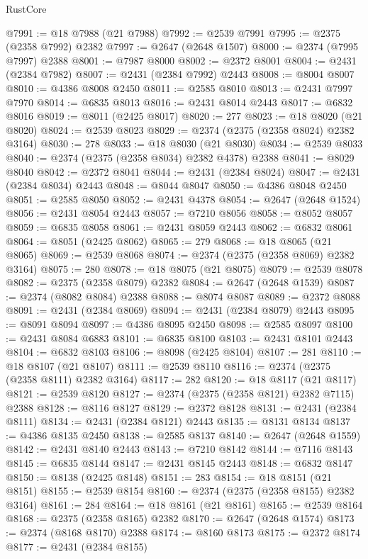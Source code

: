 \begin{lexlean}{RustCore}
\begin{coremodule}
@7991 := @18 @7988 (@21 @7988)
@7992 := @2539 @7991
@7995 := @2375 (@2358 @7992) @2382
@7997 := @2647 (@2648 @1507)
@8000 := @2374 (@7995 @7997) @2388
@8001 := @7987 @8000
@8002 := @2372 @8001
@8004 := @2431 (@2384 @7982)
@8007 := @2431 (@2384 @7992) @2443
@8008 := @8004 @8007
@8010 := @4386 @8008 @2450
@8011 := @2585 @8010
@8013 := @2431 @7997 @7970
@8014 := @6835 @8013
@8016 := @2431 @8014 @2443
@8017 := @6832 @8016
@8019 := @8011 (@2425 @8017)
@8020 := 277
@8023 := @18 @8020 (@21 @8020)
@8024 := @2539 @8023
@8029 := @2374 (@2375 (@2358 @8024) @2382 @3164)
@8030 := 278
@8033 := @18 @8030 (@21 @8030)
@8034 := @2539 @8033
@8040 := @2374 (@2375 (@2358 @8034) @2382 @4378) @2388
@8041 := @8029 @8040
@8042 := @2372 @8041
@8044 := @2431 (@2384 @8024)
@8047 := @2431 (@2384 @8034) @2443
@8048 := @8044 @8047
@8050 := @4386 @8048 @2450
@8051 := @2585 @8050
@8052 := @2431 @4378
@8054 := @2647 (@2648 @1524)
@8056 := @2431 @8054 @2443
@8057 := @7210 @8056
@8058 := @8052 @8057
@8059 := @6835 @8058
@8061 := @2431 @8059 @2443
@8062 := @6832 @8061
@8064 := @8051 (@2425 @8062)
@8065 := 279
@8068 := @18 @8065 (@21 @8065)
@8069 := @2539 @8068
@8074 := @2374 (@2375 (@2358 @8069) @2382 @3164)
@8075 := 280
@8078 := @18 @8075 (@21 @8075)
@8079 := @2539 @8078
@8082 := @2375 (@2358 @8079) @2382
@8084 := @2647 (@2648 @1539)
@8087 := @2374 (@8082 @8084) @2388
@8088 := @8074 @8087
@8089 := @2372 @8088
@8091 := @2431 (@2384 @8069)
@8094 := @2431 (@2384 @8079) @2443
@8095 := @8091 @8094
@8097 := @4386 @8095 @2450
@8098 := @2585 @8097
@8100 := @2431 @8084 @6883
@8101 := @6835 @8100
@8103 := @2431 @8101 @2443
@8104 := @6832 @8103
@8106 := @8098 (@2425 @8104)
@8107 := 281
@8110 := @18 @8107 (@21 @8107)
@8111 := @2539 @8110
@8116 := @2374 (@2375 (@2358 @8111) @2382 @3164)
@8117 := 282
@8120 := @18 @8117 (@21 @8117)
@8121 := @2539 @8120
@8127 := @2374 (@2375 (@2358 @8121) @2382 @7115) @2388
@8128 := @8116 @8127
@8129 := @2372 @8128
@8131 := @2431 (@2384 @8111)
@8134 := @2431 (@2384 @8121) @2443
@8135 := @8131 @8134
@8137 := @4386 @8135 @2450
@8138 := @2585 @8137
@8140 := @2647 (@2648 @1559)
@8142 := @2431 @8140 @2443
@8143 := @7210 @8142
@8144 := @7116 @8143
@8145 := @6835 @8144
@8147 := @2431 @8145 @2443
@8148 := @6832 @8147
@8150 := @8138 (@2425 @8148)
@8151 := 283
@8154 := @18 @8151 (@21 @8151)
@8155 := @2539 @8154
@8160 := @2374 (@2375 (@2358 @8155) @2382 @3164)
@8161 := 284
@8164 := @18 @8161 (@21 @8161)
@8165 := @2539 @8164
@8168 := @2375 (@2358 @8165) @2382
@8170 := @2647 (@2648 @1574)
@8173 := @2374 (@8168 @8170) @2388
@8174 := @8160 @8173
@8175 := @2372 @8174
@8177 := @2431 (@2384 @8155)

\end{coremodule}
\end{lexlean}
